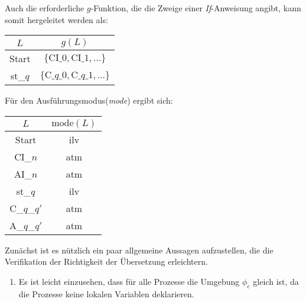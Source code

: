 Auch die erforderliche $g$-Funktion, die die Zweige einer \emph{If}-Anweisung angibt, kann somit hergeleitet werden als:

\begin{tabular}{|c|c|}
  \hline
  $L$ & $g(L)$\\
  \hline
  Start & $\{ \textrm{CI\_}0,\textrm{CI\_}1,\dots \}$\\
  st\_$q$ & $\{ \textrm{C\_}q\textrm{\_}0,\textrm{C\_}q\textrm{\_}1,\dots \}$\\
  \hline
\end{tabular}

Für den Ausführungsmodus(\emph{mode}) ergibt sich:

\begin{tabular}{|c|c|}
  \hline
  $L$ & $\textrm{mode}(L)$\\
  \hline
  Start & ilv\\
  CI\_$n$ & atm\\
  AI\_$n$ & atm\\
  st\_$q$ & ilv\\
  C\_$q$\_$q'$ & atm\\
  A\_$q$\_$q'$ & atm\\
  \hline
\end{tabular}

Zunächst ist es nützlich ein paar allgemeine Aussagen aufzustellen, die die Verifikation der Richtigkeit der Übersetzung erleichtern.
\begin{enumerate}
\item Es ist leicht einzusehen, dass für alle Prozesse die Umgebung $\phi_e$ gleich ist, da die Prozesse keine lokalen Variablen deklarieren.
\end{enumerate}

